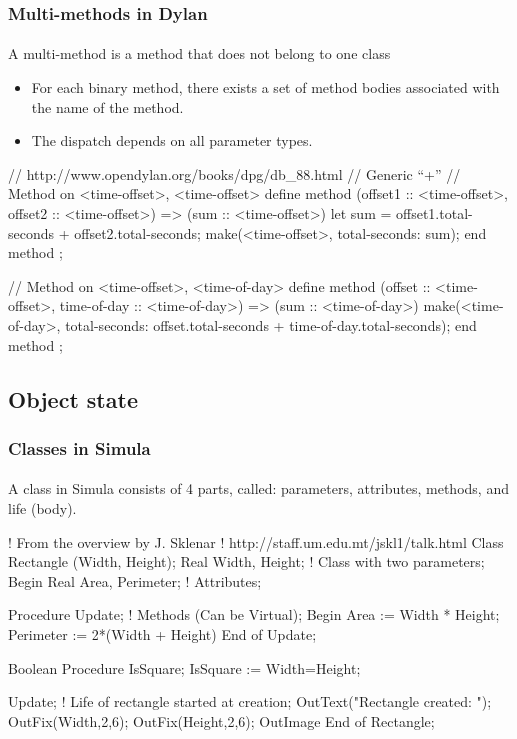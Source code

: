 \documentclass{beamer}
\begin{document}
\begin{frame}[fragile]
\frametitle{Multi-methods in Dylan}
\framesubtitle{}
A multi-method is a method that does not belong to one class
\begin{itemize}
\item For each binary method, there exists
a set of method bodies associated with the name of the method.
\item The dispatch depends on all parameter types.
\end{itemize}
\begin{cplus3}
// http://www.opendylan.org/books/dpg/db_88.html
// Generic ``+'' 
// Method on <time-offset>, <time-offset>
define method \+
    (offset1 :: <time-offset>, offset2 :: <time-offset>)
=> (sum :: <time-offset>)
 let sum = offset1.total-seconds + offset2.total-seconds;
 make(<time-offset>, total-seconds: sum);
end method \+;	

// Method on <time-offset>, <time-of-day>
define method \+ 
    (offset :: <time-offset>, time-of-day :: <time-of-day>)
 => (sum :: <time-of-day>)
  make(<time-of-day>, 
       total-seconds: offset.total-seconds + time-of-day.total-seconds);
end method \+;
\end{cplus3}
\end{frame}

\subsection{Object state}

\begin{frame}[fragile]
\frametitle{Classes in Simula}
\framesubtitle{}
A class in Simula consists of 4 parts, called:
parameters, attributes, methods,
and  life (body). 
\bigskip

\begin{cplus3}
! From the overview by J. Sklenar
! http://staff.um.edu.mt/jskl1/talk.html
Class Rectangle (Width, Height); Real Width, Height;
                           ! Class with two parameters;
 Begin
    Real Area, Perimeter;  ! Attributes;

    Procedure Update;      ! Methods (Can be Virtual);
    Begin
      Area := Width * Height;
      Perimeter := 2*(Width + Height)
    End of Update;

    Boolean Procedure IsSquare;
      IsSquare := Width=Height;

    Update;                ! Life of rectangle started at creation;
    OutText("Rectangle created: "); OutFix(Width,2,6);
    OutFix(Height,2,6); OutImage
 End of Rectangle;
\end{cplus3}
\end{frame}
\end{document}
